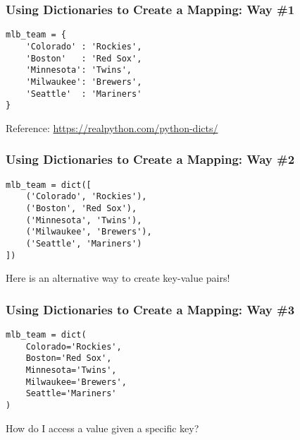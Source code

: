 \documentclass[14pt,aspectratio=169]{beamer}
\begin{document}
%
\begin{frame}[fragile]
  \frametitle{Using Dictionaries to Create a Mapping: Way \#1}
  \hspace*{.1in}
  \begin{minipage}{6in}
    \vspace*{.25in}
    \begin{verbatim}
mlb_team = {
    'Colorado' : 'Rockies',
    'Boston'   : 'Red Sox',
    'Minnesota': 'Twins',
    'Milwaukee': 'Brewers',
    'Seattle'  : 'Mariners'
}
    \end{verbatim}
  \end{minipage}
  \vspace*{.025in}
  \begin{center}
    \normalsize \noindent Reference: \url{https://realpython.com/python-dicts/} \\
  \end{center}
\end{frame}

%
\begin{frame}[fragile]
  \frametitle{Using Dictionaries to Create a Mapping: Way \#2}
  \hspace*{.1in}
  \begin{minipage}{6in}
    \vspace*{.25in}
    \begin{verbatim}
mlb_team = dict([
    ('Colorado', 'Rockies'),
    ('Boston', 'Red Sox'),
    ('Minnesota', 'Twins'),
    ('Milwaukee', 'Brewers'),
    ('Seattle', 'Mariners')
])
    \end{verbatim}
  \end{minipage}
  \vspace*{.025in}
  \begin{center}
    \normalsize \noindent Here is an alternative way to create key-value pairs! \\
  \end{center}
\end{frame}

%
\begin{frame}[fragile]
  \frametitle{Using Dictionaries to Create a Mapping: Way \#3}
  \hspace*{.1in}
  \begin{minipage}{6in}
    \vspace*{.25in}
    \begin{verbatim}
mlb_team = dict(
    Colorado='Rockies',
    Boston='Red Sox',
    Minnesota='Twins',
    Milwaukee='Brewers',
    Seattle='Mariners'
)
    \end{verbatim}
  \end{minipage}
  \vspace*{.025in}
  \begin{center}
    \normalsize \noindent How do I access a value given a specific key? \\
  \end{center}
\end{frame}
\end{document}
